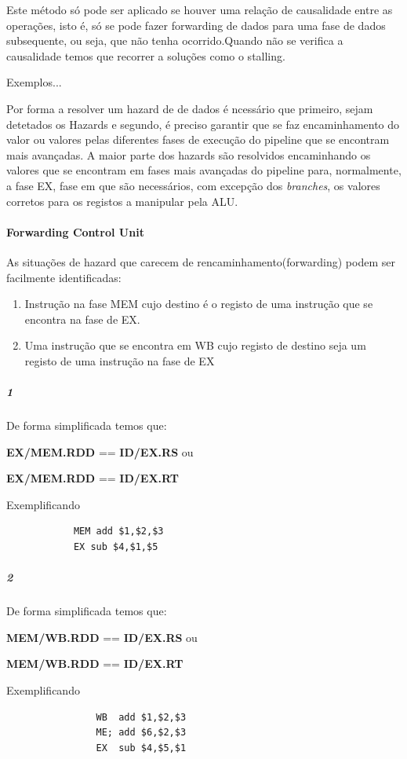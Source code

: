 \documentclass[10pt,a4paper]{book}
\begin{document}
	 Este método só pode ser aplicado se houver uma relação de causalidade entre as operações, isto é, só se pode fazer forwarding de dados para uma fase de dados subsequente, ou seja, que não tenha ocorrido.Quando não se verifica a causalidade temos que recorrer a soluções como o stalling.


	 Exemplos...

	 Por forma a resolver um hazard de de dados é ncessário que primeiro, sejam detetados os Hazards e segundo, é preciso garantir que se faz encaminhamento do valor ou valores pelas diferentes fases de execução do pipeline que se encontram mais avançadas.
	 A maior parte dos hazards são resolvidos encaminhando os valores que se encontram em fases mais avançadas do pipeline para, normalmente, a fase EX, fase em que são necessários, com excepção dos \textit{branches}, os valores corretos para os registos a manipular pela ALU.


	\paragraph{Forwarding Control Unit}

   As situações de hazard que carecem de rencaminhamento(forwarding) podem ser facilmente identificadas:
	 \begin{enumerate}
		 \item Instrução na fase MEM cujo destino é o registo de uma instrução que se encontra na fase de EX.
 		\item Uma instrução que se encontra em WB cujo registo de destino seja um registo de uma instrução na fase de EX
	 \end{enumerate}


	\subparagraph{1}
		De forma simplificada temos que:

		\textbf{EX/MEM.RDD} == \textbf{ID/EX.RS} ou

		\textbf{EX/MEM.RDD} == \textbf{ID/EX.RT}

	 Exemplificando
		\begin{lstlisting}
			MEM add $1,$2,$3
			EX sub $4,$1,$5

	  \end{lstlisting}

		\subparagraph{2}
			De forma simplificada temos que:

			\textbf{MEM/WB.RDD} == \textbf{ID/EX.RS} ou

			\textbf{MEM/WB.RDD} == \textbf{ID/EX.RT}

		 Exemplificando
			\begin{lstlisting}
				WB  add $1,$2,$3
				ME; add $6,$2,$3
				EX  sub $4,$5,$1

		  \end{lstlisting}
\end{document}
